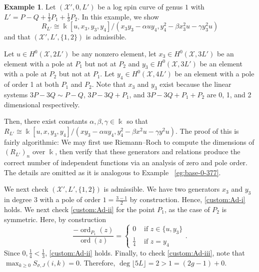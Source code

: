 \documentclass{amsart}
\theoremstyle{plain}
\theoremstyle{definition}
\newtheorem{example}[thm]{Example}
\theoremstyle{remark}
\numberwithin{equation}{section}
\newcommand\Bk{{\Bbbk}}
\DeclareMathOperator{\ord}{ord}
\newcommand\sx{\mathscr X}
\newcommand{\halfcan}{L}
\begin{document}
\begin{example}
\label{eg:base-1-33}
Let $(\sx',0 , \halfcan')$ be a log spin curve of genus $1$ with $\halfcan' = P - Q + \frac{1}{3}P_1 + \frac{1}{3}P_2$. In this example, we show
$$R_{\halfcan'} \cong \Bk[u, x_3, y_3, y_4]/(x_3 y_3- \alpha uy_4, y_4^2 - \beta x_3^2 u - \gamma y_3^2u)$$
and that $(\sx', \halfcan', \{1,2\})$ is admissible.

Let $u \in H^0(\sx,2\halfcan')$ be any nonzero element, let $x_3 \in H^0(\sx,3\halfcan')$ be an element with a pole at $P_1$ but not at $P_2$ and $y_3 \in H^0(\sx,3\halfcan')$ be an element with a pole at $P_2$ but not at $P_1$. Let $y_4 \in H^0(\sx,4\halfcan')$ be an element with a pole of order 1 at both $P_1$ and $P_2$. Note that $x_3$ and $y_3$ exist because the linear systems $3P - 3Q \sim P - Q$, $3P - 3Q + P_1$, and $3P - 3Q + P_1 + P_2$ are 0, 1, and 2 dimensional respectively.

Then, there exist constants $\alpha, \beta, \gamma \in \Bk$ so that 
$R_{\halfcan'} \cong \Bk[u, x, y_3, y_4]/(xy_3- \alpha uy_4, y_4^2 - \beta x^2 u - \gamma y^2u).$ The proof of this is fairly algorithmic: We may first use Riemann--Roch to compute the dimensions of $(R_{\halfcan'})_n$ over $\Bk$, then verify that these generators and relations produce the correct number of independent functions via an analysis of zero and pole order. The details are omitted as it is analogous to Example ~\ref{eg:base-0-377}.

We next check $(\sx', \halfcan', \{1,2\})$ is admissible. We have two generators $x_3$ and $y_3$ in degree 3 with a pole of order $1=\frac{3- 1}{2}$ by construction. Hence, \ref{custom:Ad-i} holds. We next check \ref{custom:Ad-ii} for the point $P_1$, as the case of $P_2$ is symmetric. Here, by construction
\[
\frac{-\ord_{P_1}(z)}{\ord(z)} = \begin{cases}
	0 &\text{ if }z \in \{u, y_3\}\\
	\frac{1}{4} &\text{ if }z = y_4
\end{cases}.
\]
Since $0, \frac{1}{4} < \frac{1}{3}$, \ref{custom:Ad-ii} holds.
Finally, to check \ref{custom:Ad-iii}, note that $\max_{k \geq 0}S_{\sigma,J}(i,k) = 0.$ Therefore, $\deg \lfloor 5L \rfloor  = 2 > 1 = (2 g - 1) + 0$.
\end{example}
\end{document}

